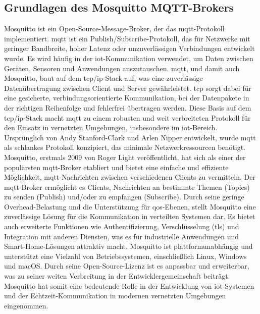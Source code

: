 
\subsection{Grundlagen des Mosquitto MQTT-Brokers}\label{subsec:mosquitto-mqtt}
Mosquitto ist ein Open-Source-Message-Broker, der das \gls{mqtt}-Protokoll implementiert.
\gls{mqtt} ist ein Publish/Subscribe-Protokoll, das für Netzwerke mit geringer Bandbreite,
hoher Latenz oder unzuverlässigen Verbindungen entwickelt wurde.
Es wird häufig in der \gls{iot}-Kommunikation verwendet, um Daten zwischen Geräten, Sensoren und Anwendungen auszutauschen.
\gls{mqtt}, und damit auch Mosquitto, baut auf dem \gls{tcp}/\gls{ip}-Stack auf, was eine zuverlässige Datenübertragung zwischen Client und
Server gewährleistet.
\gls{tcp} sorgt dabei für eine gesicherte, verbindungsorientierte Kommunikation, bei der Datenpakete in der richtigen
Reihenfolge und fehlerfrei übertragen werden.
Diese Basis auf dem \gls{tcp}/\gls{ip}-Stack macht \gls{mqtt} zu einem robusten und weit verbreiteten Protokoll für den Einsatz
in vernetzten Umgebungen, insbesondere im \gls{iot}-Bereich.
Ursprünglich von Andy Stanford-Clark und Arlen Nipper entwickelt, wurde \gls{mqtt} als schlankes Protokoll konzipiert,
das minimale Netzwerkressourcen benötigt.
Mosquitto, erstmals 2009 von Roger Light veröffentlicht, hat sich als einer der populärsten \gls{mqtt}-Broker etabliert und
bietet eine einfache und effiziente Möglichkeit, \gls{mqtt}-Nachrichten zwischen verschiedenen Clients zu vermitteln.
Der \gls{mqtt}-Broker ermöglicht es Clients, Nachrichten an bestimmte Themen (Topics) zu senden (Publish) und/oder zu
empfangen (Subscribe).
Durch seine geringe Overhead-Belastung und die Unterstützung für \gls{qos}-Ebenen, stellt Mosquitto eine zuverlässige
Lösung für die Kommunikation in verteilten Systemen dar.
Es bietet auch erweiterte Funktionen wie Authentifizierung, Verschlüsselung (\gls{tls}) und Integration mit anderen
Diensten, was es für industrielle Anwendungen und Smart-Home-Lösungen attraktiv macht.
Mosquitto ist plattformunabhängig und unterstützt eine Vielzahl von Betriebssystemen, einschließlich Linux, Windows und
macOS\@.
Durch seine Open-Source-Lizenz ist es anpassbar und erweiterbar, was zu seiner weiten Verbreitung in der
Entwicklergemeinschaft beiträgt.
Mosquitto hat somit eine bedeutende Rolle in der Entwicklung von \gls{iot}-Systemen und der Echtzeit-Kommunikation in
modernen vernetzten Umgebungen eingenommen.\newline
